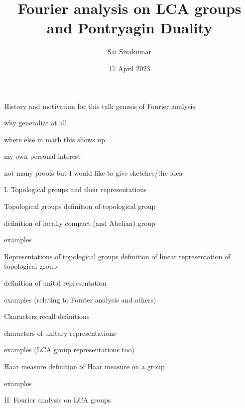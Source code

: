 \documentclass[mathserif
]{beamer}
\title
{\textcolor{black!85}{Fourier analysis on LCA groups and Pontryagin Duality}}
\author[Sai Sivakumar]{Sai Sivakumar}
\date{17 April 2023}
\begin{document}
\frame{\titlepage}

\begin{frame}{History and motivation for this talk}
    genesis of Fourier analysis 

    why generalize at all

    where else in math this shows up

    my own personal interest

    not many proofs but I would like to give sketches/the idea
\end{frame}

\begin{frame}{}
    \begin{block}{}{
        \begin{center}\Large I. Topological groups and their representations\end{center}}
    \end{block}
\end{frame}

\begin{frame}{Topological groups}
    definition of topological group

    definition of locally compact (and Abelian) group

    examples
\end{frame}

\begin{frame}{Representations of topological groups}
    definition of linear representation of topological group

    definition of unital representation

    examples (relating to Fourier analysis and others)
\end{frame}

\begin{frame}{Characters}
    recall definitions

    characters of unitary representations

    examples (LCA group representations too)
\end{frame}

\begin{frame}{Haar measure}
    definition of Haar measure on a group

    examples
\end{frame}

\begin{frame}{}
    \begin{block}{}{
        \begin{center}\Large II. Fourier analysis on LCA groups\end{center}}
    \end{block}
\end{frame}
\end{document}
